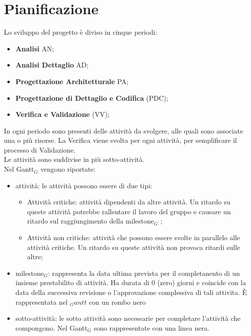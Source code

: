 \chapter{Pianificazione}
Lo sviluppo del progetto è diviso in cinque periodi:
\begin{itemize}
    \item \textbf{Analisi} AN;
    \item \textbf{Analisi Dettaglio} AD;
    \item \textbf{Progettazione Architetturale} PA;
    \item \textbf{Progettazione di Dettaglio e Codifica} (PDC);
    \item \textbf{Verifica e Validazione} (VV);
\end{itemize}
In ogni periodo sono presenti delle attività da svolgere, alle quali sono associate una o più risorse. La Verifica viene svolta per ogni attività, per semplificare il processo di Validazione.\\
Le attività sono suddivise in più sotto-attività.\\
Nel Gantt$_{G}$ vengono riportate:
\begin{itemize}
    \item attività: le attività possono essere di due tipi:
    \begin{itemize}
        \item Attività critiche: attività dipendenti da altre attività. Un ritardo su queste attività potrebbe rallentare il lavoro del gruppo e causare un ritardo sul raggiungimento della milestone$_{G}$ ;
        \item Attività non critiche: attività che possono essere svolte in parallelo alle attività critiche. Un ritardo su queste attività non provoca ritardi sulle altre;
    \end{itemize}
    \item milestone$_{G}$: rappresenta la data ultima prevista per il completanento di un insieme prestabilito di attività. Ha durata di 0 (zero) giorni e coincide con la data della successiva revisione o l'approvazione complessiva di tali attivita. È rappresentata nel $_Gantt$ con un rombo nero
    \item sotto-attività: le sotto attività sono necessarie per completare l'attività che compongono. Nel Gantt$_{G}$ sono rappresentate con una linea nera. 
\end{itemize}

